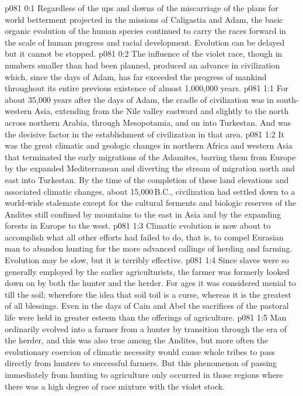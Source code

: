 \author{Archangel}
\vs p081 0:1 Regardless of the ups and downs of the miscarriage of the plans for world betterment projected in the missions of Caligastia and Adam, the basic organic evolution of the human species continued to carry the races forward in the scale of human progress and racial development. Evolution can be delayed but it cannot be stopped.
\vs p081 0:2 The influence of the violet race, though in numbers smaller than had been planned, produced an advance in civilization which, since the days of Adam, has far exceeded the progress of mankind throughout its entire previous existence of almost 1,000,000 years.
\vs p081 1:1 For about 35,000 years after the days of Adam, the cradle of civilization was in south\hyp{}western Asia, extending from the Nile valley eastward and slightly to the north across northern Arabia, through Mesopotamia, and on into Turkestan. And  was the decisive factor in the establishment of civilization in that area.
\vs p081 1:2 It was the great climatic and geologic changes in northern Africa and western Asia that terminated the early migrations of the Adamites, barring them from Europe by the expanded Mediterranean and diverting the stream of migration north and east into Turkestan. By the time of the completion of these land elevations and associated climatic changes, about 15,000\,B.C., civilization had settled down to a world\hyp{}wide stalemate except for the cultural ferments and biologic reserves of the Andites still confined by mountains to the east in Asia and by the expanding forests in Europe to the west.
\vs p081 1:3 Climatic evolution is now about to accomplish what all other efforts had failed to do, that is, to compel Eurasian man to abandon hunting for the more advanced callings of herding and farming. Evolution may be slow, but it is terribly effective.
\vs p081 1:4 Since slaves were so generally employed by the earlier agriculturists, the farmer was formerly looked down on by both the hunter and the herder. For ages it was considered menial to till the soil; wherefore the idea that soil toil is a curse, whereas it is the greatest of all blessings. Even in the days of Cain and Abel the sacrifices of the pastoral life were held in greater esteem than the offerings of agriculture.
\vs p081 1:5 Man ordinarily evolved into a farmer from a hunter by transition through the era of the herder, and this was also true among the Andites, but more often the evolutionary coercion of climatic necessity would cause whole tribes to pass directly from hunters to successful farmers. But this phenomenon of passing immediately from hunting to agriculture only occurred in those regions where there was a high degree of race mixture with the violet stock.
